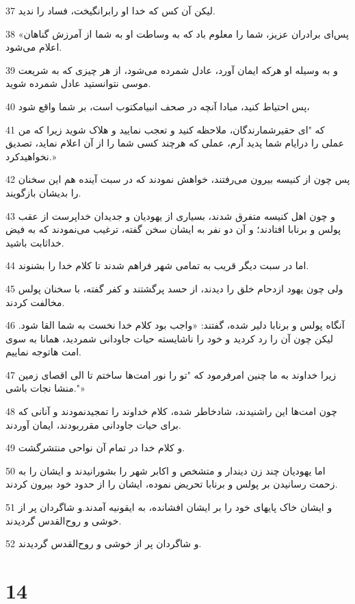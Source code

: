 \par 37 لیکن آن کس که خدا او رابرانگیخت، فساد را ندید.
\par 38 «پس‌ای برادران عزیز، شما را معلوم باد که به وساطت او به شما از آمرزش گناهان اعلام می‌شود.
\par 39 و به وسیله او هر‌که ایمان آورد، عادل شمرده می‌شود، از هر چیزی که به شریعت موسی نتوانستید عادل شمرده شوید.
\par 40 پس احتیاط کنید، مبادا آنچه در صحف انبیامکتوب است، بر شما واقع شود،
\par 41 که "ای حقیرشمارندگان، ملاحظه کنید و تعجب نمایید و هلاک شوید زیرا که من عملی را درایام شما پدید آرم، عملی که هر‌چند کسی شما را از آن اعلام نماید، تصدیق نخواهیدکرد.»
\par 42 پس چون از کنیسه بیرون می‌رفتند، خواهش نمودند که در سبت آینده هم این سخنان را بدیشان بازگویند.
\par 43 و چون اهل کنیسه متفرق شدند، بسیاری از یهودیان و جدیدان خداپرست از عقب پولس و برنابا افتادند؛ و آن دو نفر به ایشان سخن گفته، ترغیب می‌نمودند که به فیض خداثابت باشید.
\par 44 اما در سبت دیگر قریب به تمامی شهر فراهم شدند تا کلام خدا را بشنوند.
\par 45 ولی چون یهود ازدحام خلق را دیدند، از حسد پرگشتند و کفر گفته، با سخنان پولس مخالفت کردند.
\par 46 آنگاه پولس و برنابا دلیر شده، گفتند: «واجب بود کلام خدا نخست به شما القا شود. لیکن چون آن را رد کردید و خود را ناشایسته حیات جاودانی شمردید، همانا به سوی امت هاتوجه نماییم.
\par 47 زیرا خداوند به ما چنین امرفرمود که "تو را نور امت‌ها ساختم تا الی اقصای زمین منشا نجات باشی."»
\par 48 چون امت‌ها این راشنیدند، شادخاطر شده، کلام خداوند را تمجیدنمودند و آنانی که برای حیات جاودانی مقرربودند، ایمان آوردند.
\par 49 و کلام خدا در تمام آن نواحی منتشرگشت.
\par 50 اما یهودیان چند زن دیندار و متشخص و اکابر شهر را بشورانیدند و ایشان را به زحمت رسانیدن بر پولس و برنابا تحریض نموده، ایشان را از حدود خود بیرون کردند.
\par 51 و ایشان خاک پایهای خود را بر ایشان افشانده، به ایقونیه آمدند.و شاگردان پر از خوشی و روح‌القدس گردیدند.
\par 52 و شاگردان پر از خوشی و روح‌القدس گردیدند.

\chapter{14}

